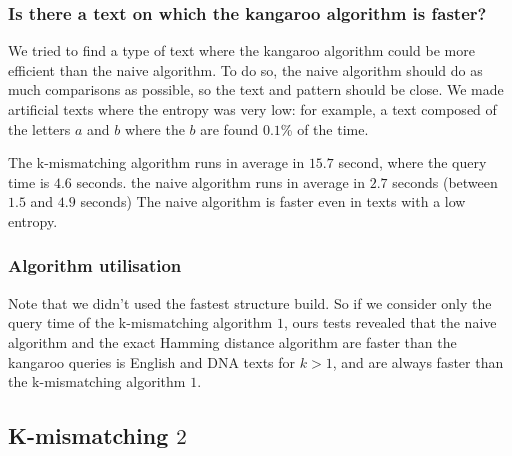 \documentclass[preprint,12pt]{elsarticle}
\begin{document}
\subsubsection*{Is there a text on which the kangaroo algorithm is faster?}

We tried to find a type of text where the kangaroo algorithm could be more efficient than the naive algorithm.
To do so, the naive algorithm should do as much comparisons as possible,
so the text and pattern should be close.
We made artificial texts where the entropy was very low:
for example, a text composed of the letters $a$ and $b$ where the $b$ are found $0.1$\% of the time.

The k-mismatching algorithm runs in average in $15.7$ second, where the query time is $4.6$ seconds.
the naive algorithm runs in average in $2.7$ seconds (between $1.5$ and $4.9$ seconds)
The naive algorithm is faster even in texts with a low entropy.



\subsubsection*{Algorithm utilisation}

Note that we didn't used the fastest structure build.
So if we consider only the query time of the k-mismatching algorithm $1$,
ours tests revealed that the naive algorithm and the exact Hamming distance algorithm
are faster than the kangaroo queries is English and DNA texts for $k > 1$,
and are always faster than the k-mismatching algorithm $1$. 






\subsection{K-mismatching $2$}


\end{document}
